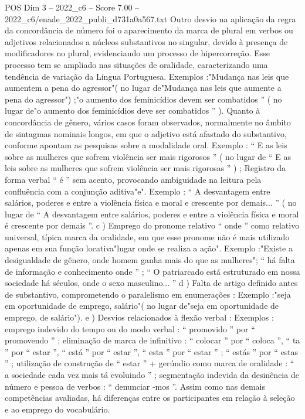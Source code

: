 \begin{textsample}{POS Dim 3 – 2022\_c6 – Score 7.00 – 2022\_c6/enade\_2022\_publi\_d731a0a567.txt}
Outro desvio na aplicação da regra da concordância de número foi o aparecimento da marca de plural em verbos ou adjetivos relacionados a núcleos substantivos no singular, devido à presença de modificadores no plural, evidenciando um processo de hipercorreção.
Esse processo tem se ampliado nas situações de oralidade, caracterizando uma tendência de variação da Língua Portuguesa.
Exemplos :"Mudança nas leis que aumentem a pena do agressor"( no lugar de"Mudança nas leis que aumente a pena do agressor") ;"o aumento dos feminicídios devem ser combatidos ” ( no lugar de"o aumento dos feminicídios deve ser combatidos ” ).
Quanto à concordância de gênero, vários casos foram observados, normalmente no âmbito de sintagmas nominais longos, em que o adjetivo está afastado do substantivo, conforme apontam as pesquisas sobre a modalidade oral.
Exemplo : “ E as leis sobre as mulheres que sofrem violência ser mais rigorosos ” ( no lugar de “ E as leis sobre as mulheres que sofrem violência ser mais rigorosas ” ) ; Registro da forma verbal “ é ” sem acento, provocando ambiguidade na leitura pela confluência com a conjunção aditiva"e".
Exemplo : “ A desvantagem entre salários, poderes e entre a violência física e moral e crescente por demais... ” ( no lugar de “ A desvantagem entre salários, poderes e entre a violência física e moral é crescente por demais ”. c ) Emprego do pronome relativo “ onde ” como relativo universal, típica marca da oralidade, em que esse pronome não é mais utilizado apenas em sua função locativa"lugar onde se realiza a ação".
Exemplo :"Existe a desigualdade de gênero, onde homem ganha mais do que as mulheres"; “ há falta de informação e conhecimento onde ” ; “ O patriarcado está estruturado em nossa sociedade há séculos, onde o sexo masculino... ” d ) Falta de artigo definido antes de substantivo, comprometendo o paralelismo em enumerações : Exemplo :"seja em oportunidade de emprego, salário"( no lugar de"seja em oportunidade de emprego, de salário"). e ) Desvios relacionados à flexão verbal : Exemplos : emprego indevido do tempo ou do modo verbal : “ promovido ” por “ promovendo ” ; eliminação de marca de infinitivo : “ colocar ” por “ coloca ”, “ ta ” por “ estar ”, “ está ” por “ estar ”, “ esta ” por “ estar ” ; “ estás ” por “ estas ” ; utilização de construção de “ estar ” + gerúndio como marca de oralidade : “ a sociedade cada vez mais tá evoluindo ” ; segmentação indevida da desinência de número e pessoa de verbos : “ denunciar -mos ”.
Assim como nas demais competências avaliadas, há diferenças entre os participantes em relação à seleção e ao emprego do vocabulário.

\end{textsample}
